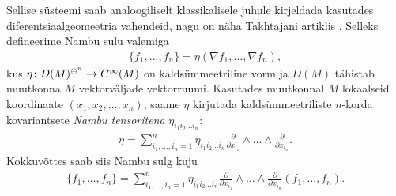 Sellise süsteemi saab analoogiliselt klassikalisele juhule kirjeldada
kasutades diferentsiaalgeomeetria vahendeid, nagu on näha
Takhtajani artiklis \cite{takhtajan1994}. Selleks defineerime Nambu
sulu valemiga
\begin{align*}
    \{f_1, \dots, f_n\} = \eta\left( \nabla f_1, \dots, \nabla f_n \right),
\end{align*}
kus $\eta \colon D(M)^{\oplus^n} \to C^\infty(M)$ on kaldsümmeetriline vorm ja
$D(M)$ tähistab muutkonna $M$ vektorväljade vektorruumi. Kasutades
muutkonnal $M$ lokaalseid koordinaate $(x_1, x_2, \dots, x_n)$, saame
$\eta$ kirjutada kaldsümmeetriliste $n$-korda kovariantsete
\emph{Nambu tensoritena} $\eta_{i_1 i_2 \dots i_n}$:
\begin{align*}
    \eta = \sum_{i_1, \dots, i_n = 1}^{n} \eta_{i_1 i_2 \dots i_n}
        \frac{\partial}{\partial x_{i_1}}
        \wedge \dots \wedge
        \frac{\partial}{\partial x_{i_n}}.
\end{align*}
Kokkuvõttes saab siis Nambu sulg kuju
\begin{align*}
    \{f_1, \dots, f_n\} =
    \sum_{i_1, \dots, i_n = 1}^{n} \eta_{i_1 i_2 \dots i_n}
        \frac{\partial}{\partial x_{i_1}}
        \wedge \dots \wedge
        \frac{\partial}{\partial x_{i_n}} (f_1, \dots, f_n).
\end{align*}
